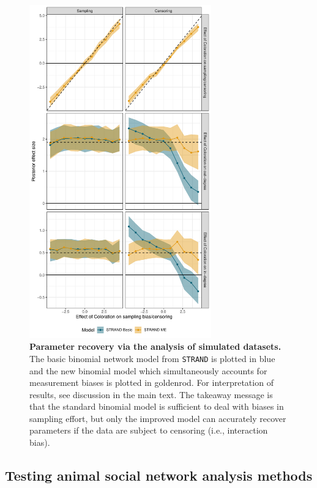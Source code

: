 \documentclass[Afour,sageh,times]{sagej}
\begin{document}
\begin{figure}[t]
  \caption{\textbf{Parameter recovery via the analysis of simulated datasets.} The basic binomial network model from \texttt{STRAND} is plotted in blue and the new binomial model which simultaneously accounts for measurement biases is plotted in goldenrod. For interpretation of results, see discussion in the main text. The takeaway message is that the standard binomial model is sufficient to deal with biases in sampling effort, but only the improved model can accurately recover parameters if the data are subject to censoring (i.e., interaction bias). }
  \label{validate}
  \centering
      \includegraphics[width=0.7\textwidth]{Figures/Parameter_Recovery}
\end{figure}



\subsection{Testing animal social network analysis methods}
\end{document}
